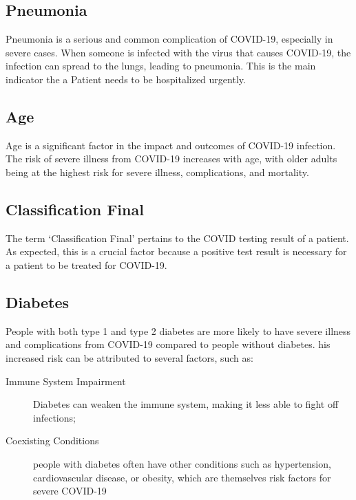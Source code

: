 \subsection{Pneumonia}

Pneumonia is a serious and common complication of COVID-19, especially in 
severe cases. When someone is infected with the virus that causes COVID-19,
 the infection can spread to the lungs, leading to 
pneumonia. This is the main indicator the a Patient needs to be hospitalized 
urgently. 

\subsection{Age}
Age is a significant factor in the impact and outcomes of COVID-19 infection.
The risk of severe illness from COVID-19 increases with age, with older adults
being at the highest risk for severe illness, complications, and mortality.

\subsection{Classification Final}
The term `Classification Final' pertains to the COVID testing result of a 
patient. As expected, this is a crucial factor because a positive test result
is necessary for a patient to be treated for COVID-19.

\subsection{Diabetes}

People with both type 1 and type 2 diabetes are more likely to have severe 
illness and complications from COVID-19 compared to people without diabetes. 
his increased risk can be attributed to several factors, such as:
\begin{description}
\item[Immune System Impairment] Diabetes can weaken the immune system, 
making it less able to fight off infections;
\item[Coexisting Conditions] people with diabetes often have other 
conditions such as hypertension, cardiovascular disease, or obesity, 
which are themselves risk factors for severe COVID-19
\end{description}
